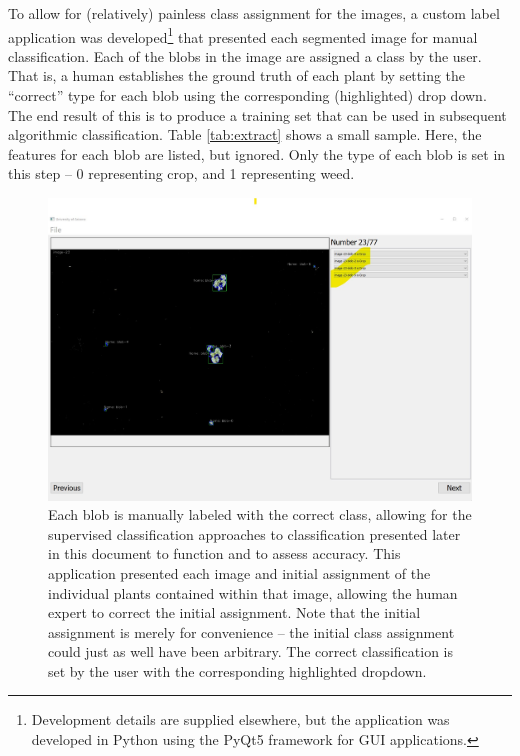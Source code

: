 \documentclass[letterpaper]{article}
\begin{document}
{To allow for (relatively) painless class assignment for the images, a custom label application was developed\footnote{Development details are supplied elsewhere, but the application was developed in Python using the PyQt5 framework for GUI applications.} that presented each segmented image for manual classification. Each of the blobs in the image are assigned a class by the user. That is, a human establishes the ground truth of each plant by setting the ``correct'' type for each blob using the corresponding (highlighted) drop down. The end result of this is to produce a training set that can be used in subsequent algorithmic classification. Table \ref{tab:extract} shows a small sample. Here, the features for each blob are listed, but ignored. Only the type of each blob is set in this step -- 0 representing crop, and 1 representing weed.
\begin{figure}[H]
	\centering
	\includegraphics[scale=0.25]{./figures/screenshot-classification.jpg}
	\caption[Manual classification application screenshot]{Each blob is manually labeled with the correct class, allowing for the supervised classification approaches to classification presented later in this document to function and to assess accuracy. This application presented each image and initial assignment of the individual plants contained within that image, allowing the human expert to correct the initial assignment. Note that the initial assignment is merely for convenience -- the initial class assignment could just as well have been arbitrary. The correct classification is set by the user with the corresponding highlighted dropdown.}
	\label{fig:screenshot-classification}
\end{figure}

}
\end{document}

